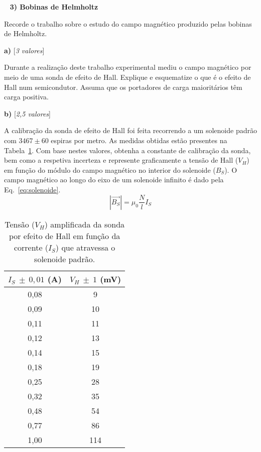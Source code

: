 \documentclass[11pt,a4paper,final]{article}
\begin{document}
~\linebreak
\noindent\textbf{3) Bobinas de Helmholtz} %

Recorde o trabalho sobre o estudo do campo magn\'{e}tico produzido pelas bobinas de Helmholtz.

\textbf{a)} \hfill [\textit{3 valores}]

Durante a realiza\c{c}\~{a}o deste trabalho experimental mediu o campo magn\'{e}tico por meio de uma sonda de efeito de Hall. Explique e esquematize o que \'{e} o efeito de Hall num semicondutor. Assuma que os portadores de carga maiorit\'{a}rios t\^{e}m carga positiva.

\textbf{b)} \hfill [\textit{2,5 valores}]

A calibra\c{c}\~{a}o da sonda de efeito de Hall foi feita recorrendo a um solenoide padr\~{a}o com $3467\pm60$ espiras por metro. As medidas obtidas est\~{a}o presentes na Tabela~\ref{tab:hall}. Com base nestes valores, obtenha a constante de calibração da sonda, bem como a respetiva incerteza e represente graficamente a tens\~{a}o de Hall ($V_H$) em fun\c{c}\~{a}o do m\'{o}dulo do campo magn\'{e}tico no interior do solenoide ($B_S$). O campo magn\'{e}tico ao longo do eixo de um solenoide infinito \'{e} dado pela Eq.~\ref{eq:solenoide}.
\begin{equation}
\label{eq:solenoide}
\left|\overrightarrow{B_S}\right|=\mu_0\frac{N}{l}I_S
\end{equation}

\begin{table}[h]
\caption{\label{tab:hall}Tens\~{a}o ($V_H$) amplificada da sonda por efeito de Hall em fun\c{c}\~{a}o da corrente ($I_S$) que atravessa o solenoide padr\~{a}o.}
\begin{center}
\begin{tabular}{|c|c|}
\hline
$I_S~\pm~0,01$ (A) & $V_H~\pm~1$ (mV) \\ \hline
0,08 & 9 \\ 
0,09 & 10 \\ 
0,11 & 11 \\ 
0,12 & 13 \\ 
0,14 & 15 \\ 
0,18 & 19 \\ 
0,25 & 28 \\ 
0,32 & 35 \\ 
0,48 & 54 \\ 
0,77 & 86 \\ 
1,00 & 114 \\ \hline
\end{tabular}
\end{center}
\end{table}
\end{document}
